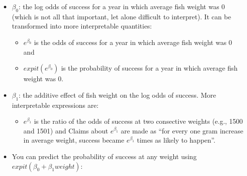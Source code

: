 \documentclass[]{book}
\newenvironment{Shaded}{\begin{snugshade}}{\end{snugshade}}
\newcommand{\KeywordTok}[1]{\textcolor[rgb]{0.13,0.29,0.53}{\textbf{#1}}}
\newcommand{\DataTypeTok}[1]{\textcolor[rgb]{0.13,0.29,0.53}{#1}}
\newcommand{\DecValTok}[1]{\textcolor[rgb]{0.00,0.00,0.81}{#1}}
\newcommand{\StringTok}[1]{\textcolor[rgb]{0.31,0.60,0.02}{#1}}
\newcommand{\CommentTok}[1]{\textcolor[rgb]{0.56,0.35,0.01}{\textit{#1}}}
\newcommand{\OperatorTok}[1]{\textcolor[rgb]{0.81,0.36,0.00}{\textbf{#1}}}
\newcommand{\NormalTok}[1]{#1}
\providecommand{\tightlist}{%
  \setlength{\itemsep}{0pt}\setlength{\parskip}{0pt}}
\theoremstyle{definition}
\theoremstyle{definition}
\theoremstyle{definition}
\theoremstyle{remark}
\begin{document}
\begin{itemize}
\tightlist
\item
  \(\beta_0\): the log odds of success for a year in which average fish
  weight was 0 (which is not all that important, let alone difficult to
  interpret). It can be transformed into more interpretable quantities:

  \begin{itemize}
  \tightlist
  \item
    \(e^{\beta_0}\) is the odds of success for a year in which average
    fish weight was 0 and
  \item
    \(expit(e^{\beta_0})\) is the probability of success for a year in
    which average fish weight was 0.
  \end{itemize}
\item
  \(\beta_1\): the additive effect of fish weight on the log odds of
  success. More interpretable expressions are:

  \begin{itemize}
  \tightlist
  \item
    \(e^{\beta_1}\) is the ratio of the odds of success at two
    consective weights (e.g., 1500 and 1501) and Claims about
    \(e^{\beta_1}\) are made as ``for every one gram increase in average
    weight, success became \(e^{\beta_1}\) times as likely to happen''.
  \end{itemize}
\item
  You can predict the probability of success at any weight using
  \(expit(\beta_0 + \beta_1 weight)\):
\end{itemize}

\begin{Shaded}
\end{Shaded}
\end{document}
